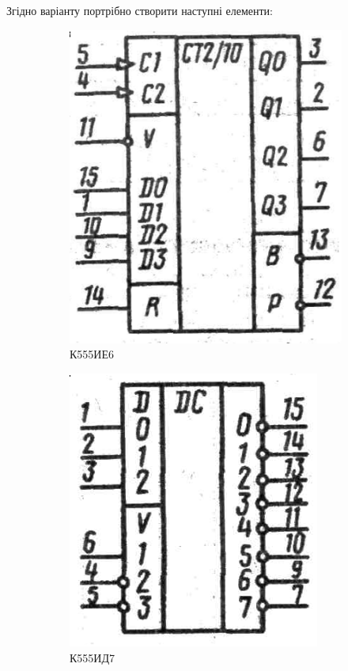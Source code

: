 Згідно варіанту портрібно створити наступні елементи:
\begin{figure}[!htb]
  \begin{subfigure}[b]{.4\linewidth}
    \centering \includegraphics[width=.8\linewidth]{./images/lab2/target_element1.png}
    \caption{К555ИЕ6}
    \label{fig:lab2:target_element1}
  \end{subfigure}
  \hfill
  \begin{subfigure}[b]{.4\linewidth}
    \centering \includegraphics[width=.8\linewidth]{./images/lab2/target_element2.png}
    \caption{К555ИД7}
    \label{fig:lab2:target_element2}
  \end{subfigure}
  \caption{\label{fig:lab2:target_elements}}
\end{figure}
\FloatBarrier

